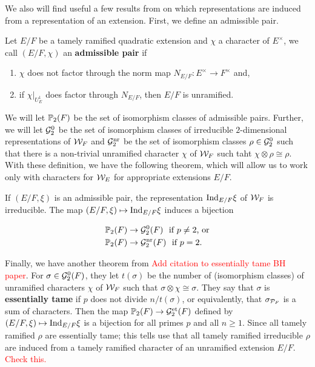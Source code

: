 We also will find useful a few results from \cite{Bushnell2006} on which representations are induced from a representation of an extension.
First, we define an admissible pair.
\begin{defn}
  Let $E/F$ be a tamely ramified quadratic extension and $\chi$ a character of $E^\times$, we call $(E/F, \chi)$ an \textbf{admissible pair} if
  \begin{enumerate}
  \item $\chi$ does not factor through the norm map $N_{E/F}: E^\times \to F^\times$ and,
    \item if $\chi|_{U_E^1}$ does factor through $N_{E/F}$, then $E/F$ is unramified.
  \end{enumerate}
\end{defn}

We will let $\mathbb{P}_2(F)$ be the set of isomorphism classes of admissible pairs. Further, we will let $\mathcal{G}_2^0$ be the set of isomorphism classes of irreducible $2$-dimensional representations of $\mathcal{W}_F$ and $\mathcal{G}_2^{\textrm{nr}}$ be the set of isomorphism classes $\rho \in \mathcal{G}_2^0$ such that there is a non-trivial unramified character $\chi$ of $\mathcal{W}_F$ such taht $\chi \otimes \rho \cong \rho$.
With these definition, we have the following theorem, which will allow us to work only with characters for $\mathcal{W}_E$ for appropriate extensions $E/F$.
\begin{theorem}
  If $(E/F, \xi)$ is an admissible pair, the representation $\textrm{Ind}_{E/F} \xi$ of $\mathcal{W}_F$ is irreducible. The map $(E/F, \xi) \mapsto \textrm{Ind}_{E/F} \xi$ induces a bijection

  \begin{align*}
    \mathbb{P}_2(F) &\to \mathcal{G}_2^0(F) \,\,  \text{ if } p \neq 2 \text{, or} \\
    \mathbb{P}_2(F) &\to \mathcal{G}_2^{\textrm{nr}}(F) \,\, \text{ if } p = 2.
  \end{align*}
\end{theorem} 

Finally, we have another theorem from \textcolor{red}{Add citation to essentially tame BH paper}.
For $\sigma \in \mathcal{G}_2^0(F)$, they let $t(\sigma)$ be the number of (isomorphism classes) of unramified characters $\chi$ of $\mathcal{W}_F$ such that $\sigma \otimes \chi \cong \sigma$.
They say that $\sigma$ is \textbf{essentially tame} if $p$ does not divide $n / t(\sigma)$, or equivalently, that $\sigma_{\mathcal{P}_F}$ is a sum of characters.
Then the map $\mathbb{P}_2(F) \to \mathcal{G}_2^{\textrm{et}}(F)$ defined by $(E/F, \xi) \mapsto \textrm{Ind}_{E/F} \xi$ is a bijection for all primes $p$ and all $n \geq 1$.
Since all tamely ramified $\rho$ are essentially tame; this tells use that all tamely ramified irreducible $\rho$ are induced from a tamely ramified character of an unramified extension $E/F$.
\textcolor{red}{Check this.}

